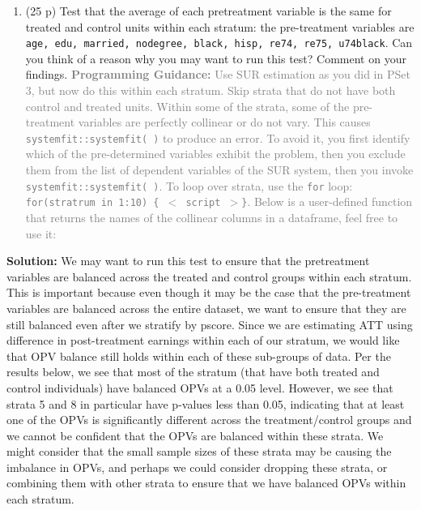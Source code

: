 \documentclass[
]{article}
\providecommand{\tightlist}{%
  \setlength{\itemsep}{0pt}\setlength{\parskip}{0pt}}
\begin{document}
\begin{enumerate}
\def\labelenumi{\alph{enumi}.}
\setcounter{enumi}{1}
\tightlist
\item
  (25 p) Test that the average of each pretreatment variable is the same
  for treated and control units within each stratum: the pre-treatment
  variables are
  \texttt{age, edu, married, nodegree, black, hisp, re74, re75, u74black}.
  Can you think of a reason why you may want to run this test? Comment
  on your findings.
  \textcolor{gray}{\textbf{Programming Guidance:} Use SUR estimation as you did in PSet 3, but now do this within each stratum. Skip strata that do not have both control and treated units. Within some of the strata, some of the pre-treatment variables are perfectly collinear or do not vary. This causes \texttt{systemfit::systemfit( )} to produce an error. To avoid it, you first identify which of the pre-determined variables exhibit the problem, then you exclude them from the list of dependent variables of the SUR system, then you invoke \texttt{systemfit::systemfit( )}. To loop over strata, use the \texttt{for} loop: \texttt{for(stratrum in 1:10) \{ $<$ script $>$\}}. Below is a user-defined function that returns the names of the collinear columns in a dataframe, feel free to use it:}
\end{enumerate}

\textbf{Solution:} We may want to run this test to ensure that the
pretreatment variables are balanced across the treated and control
groups within each stratum. This is important because even though it may
be the case that the pre-treatment variables are balanced across the
entire dataset, we want to ensure that they are still balanced even
after we stratify by pscore. Since we are estimating ATT using
difference in post-treatment earnings within each of our stratum, we
would like that OPV balance still holds within each of these sub-groups
of data. Per the results below, we see that most of the stratum (that
have both treated and control individuals) have balanced OPVs at a 0.05
level. However, we see that strata 5 and 8 in particular have p-values
less than 0.05, indicating that at least one of the OPVs is
significantly different across the treatment/control groups and we
cannot be confident that the OPVs are balanced within these strata. We
might consider that the small sample sizes of these strata may be
causing the imbalance in OPVs, and perhaps we could consider dropping
these strata, or combining them with other strata to ensure that we have
balanced OPVs within each stratum.
\end{document}
